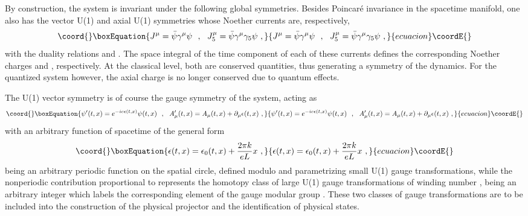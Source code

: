 \documentclass[a4paper,11pt]{article}
\def\Z{\mathbb Z}
\begin{document}
By construction, the system is invariant under the following
global symmetries. Besides Poincar\'e invariance in the spacetime manifold,
one also has the vector U(1) and axial U(1)\coordHE{} symmetries whose Noether
currents are, res\-pec\-ti\-ve\-ly,
\begin{equation}\coord{}\boxEquation{
J^\mu=\bar{\psi}\gamma^\mu\psi\ \ ,\ \ 
J^\mu_5=\bar{\psi}\gamma^\mu\gamma_5\psi\ ,
}{
J^\mu=\bar{\psi}\gamma^\mu\psi\ \ ,\ \ 
J^\mu_5=\bar{\psi}\gamma^\mu\gamma_5\psi\ ,
}{ecuacion}\coordE{}\end{equation}
with the duality relations \coordHE{} and
\coordHE{}. The space integral of the time component
of each of these currents defines the corresponding Noether charges \myHighlight{$Q$}\coordHE{} and
\myHighlight{$Q_5$}\coordHE{}, respectively. At the classical level, both are conserved quantities, 
thus generating a symmetry of the dynamics. For the quantized system however, 
the axial charge is no longer conserved due to quantum effects.

The U(1) vector symmetry is of course the gauge symmetry of the system,
acting as
\begin{equation}\coord{}\boxEquation{
\psi'(t,x)=e^{-ie\epsilon(t,x)}\psi(t,x)\ \ ,\ \ 
A'_\mu(t,x)=A_\mu(t,x)+\partial_\mu\epsilon(t,x)\ ,
}{
\psi'(t,x)=e^{-ie\epsilon(t,x)}\psi(t,x)\ \ ,\ \ 
A'_\mu(t,x)=A_\mu(t,x)+\partial_\mu\epsilon(t,x)\ ,
}{ecuacion}\coordE{}\end{equation}
with \coordHE{} an arbitrary function of spacetime of the general form
\begin{equation}\coord{}\boxEquation{
\epsilon(t,x)=\epsilon_0(t,x)+\frac{2\pi k}{eL}x\ ,
}{
\epsilon(t,x)=\epsilon_0(t,x)+\frac{2\pi k}{eL}x\ ,
}{ecuacion}\coordE{}\end{equation}
\myHighlight{$\epsilon_0(t,x+L)=\epsilon_0(t,x)$}\coordHE{} being an arbitrary periodic function
on the spatial circle, defined modulo \coordHE{} and parametrizing small U(1)
gauge transformations, while the nonperiodic contribution proportional to \coordHE{} 
represents the homotopy class of large U(1) gauge transformations of
winding number \myHighlight{$k$}\coordHE{}, \myHighlight{$k$}\coordHE{} being an arbitrary integer which labels the 
corresponding element of the gauge modular group \myHighlight{$\Z$}\coordHE{}. These two classes of 
gauge transformations are to be included into the construction of the 
physical projector and the identification of physical states.  
\end{document}
